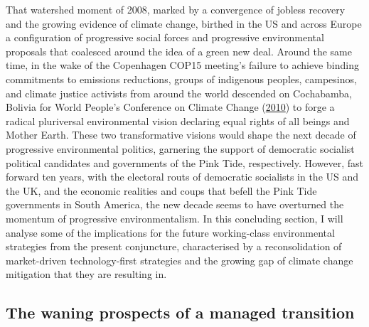 \documentclass[a4paper, nobind]{templates/ociamthesis}
\begin{document}
That watershed moment of 2008, marked by a convergence of jobless recovery and the growing evidence of climate change, birthed in the US and across Europe a configuration of progressive social forces and progressive environmental proposals that coalesced around the idea of a green new deal. Around the same time, in the wake of the Copenhagen COP15 meeting's failure to achieve binding commitments to emissions reductions, groups of indigenous peoples, campesinos, and climate justice activists from around the world descended on Cochabamba, Bolivia for World People's Conference on Climate Change (\protect\hyperlink{ref-world_peoples_conference_on_climate_change_rights_2010}{2010}) to forge a radical pluriversal environmental vision declaring equal rights of all beings and Mother Earth. These two transformative visions would shape the next decade of progressive environmental politics, garnering the support of democratic socialist political candidates and governments of the Pink Tide, respectively. However, fast forward ten years, with the electoral routs of democratic socialists in the US and the UK, and the economic realities and coups that befell the Pink Tide governments in South America, the new decade seems to have overturned the momentum of progressive environmentalism. In this concluding section, I will analyse some of the implications for the future working-class environmental strategies from the present conjuncture, characterised by a reconsolidation of market-driven technology-first strategies and the growing gap of climate change mitigation that they are resulting in.

\hypertarget{the-waning-prospects-of-a-managed-transition}{%
\subsection{The waning prospects of a managed transition}\label{the-waning-prospects-of-a-managed-transition}}
\end{document}
